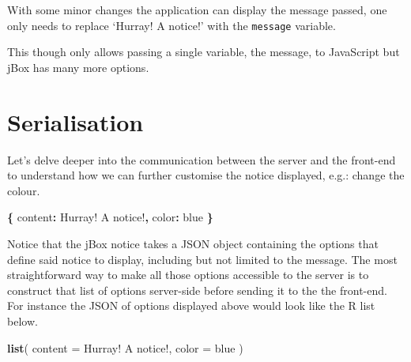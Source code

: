 \documentclass[
]{krantz}
\makeatletter
\newenvironment{Shaded}{\begin{snugshade}}{\end{snugshade}}
\newcommand{\DataTypeTok}[1]{\textcolor[rgb]{0.27,0.27,0.27}{#1}}
\newcommand{\KeywordTok}[1]{\textcolor[rgb]{0.27,0.27,0.27}{\textbf{#1}}}
\newcommand{\NormalTok}[1]{#1}
\newcommand{\OperatorTok}[1]{\textcolor[rgb]{0.43,0.43,0.43}{\textbf{#1}}}
\newcommand{\StringTok}[1]{\textcolor[rgb]{0.5,0.5,0.5}{#1}}
\newenvironment{kframe}{%
\medskip{}
\setlength{\fboxsep}{.8em}
 \def\at@end@of@kframe{}%
 \ifinner\ifhmode%
  \def\at@end@of@kframe{\end{minipage}}%
  \begin{minipage}{\columnwidth}%
 \fi\fi%
 \def\FrameCommand##1{\hskip\@totalleftmargin \hskip-\fboxsep
 \colorbox{shadecolor}{##1}\hskip-\fboxsep
     \hskip-\linewidth \hskip-\@totalleftmargin \hskip\columnwidth}%
 \MakeFramed {\advance\hsize-\width
   \@totalleftmargin\z@ \linewidth\hsize
   \@setminipage}}%
 {\par\unskip\endMakeFramed%
 \at@end@of@kframe}
\renewenvironment{Shaded}{\begin{kframe}}{\end{kframe}}
\makeatother
\begin{document}
With some minor changes the application can display the message passed, one only needs to replace `Hurray! A notice!' with the \texttt{message} variable.

\begin{Shaded}
\end{Shaded}

This though only allows passing a single variable, the message, to JavaScript but jBox has many more options.

\hypertarget{serialisation}{%
\section*{Serialisation}\label{serialisation}}


Let's delve deeper into the communication between the server and the front-end to understand how we can further customise the notice displayed, e.g.: change the colour.

\begin{Shaded}
\begin{Highlighting}[]
\OperatorTok{\{}
  \DataTypeTok{content}\OperatorTok{:} \StringTok{\textquotesingle{}Hurray! A notice!\textquotesingle{}}\OperatorTok{,}
  \DataTypeTok{color}\OperatorTok{:} \StringTok{\textquotesingle{}blue\textquotesingle{}}
\OperatorTok{\}}
\end{Highlighting}
\end{Shaded}

Notice that the jBox notice takes a JSON object containing the options that define said notice to display, including but not limited to the message. The most straightforward way to make all those options accessible to the server is to construct that list of options server-side before sending it to the the front-end. For instance the JSON of options displayed above would look like the R list below.

\begin{Shaded}
\begin{Highlighting}[]
\KeywordTok{list}\NormalTok{(}
  \DataTypeTok{content =} \StringTok{\textquotesingle{}Hurray! A notice!\textquotesingle{}}\NormalTok{,}
  \DataTypeTok{color =} \StringTok{\textquotesingle{}blue\textquotesingle{}}
\NormalTok{)}
\end{Highlighting}
\end{Shaded}
\end{document}
